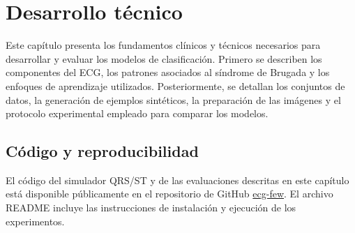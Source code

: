 \chapter{Desarrollo técnico}
\label{chap:desarrollo}

Este capítulo presenta los fundamentos clínicos y técnicos necesarios para desarrollar y evaluar los modelos de clasificación. Primero se describen los componentes del ECG, los patrones asociados al síndrome de Brugada y los enfoques de aprendizaje utilizados. Posteriormente, se detallan los conjuntos de datos, la generación de ejemplos sintéticos, la preparación de las imágenes y el protocolo experimental empleado para comparar los modelos.





\section{Código y reproducibilidad}
\label{sec:codigo_reproducibilidad}

El código del simulador QRS/ST y de las evaluaciones descritas en este capítulo está disponible públicamente en el repositorio de GitHub \href{https://github.com/nahuelcostac/ecg-few}{ecg-few}. El archivo README incluye las instrucciones de instalación y ejecución de los experimentos.
